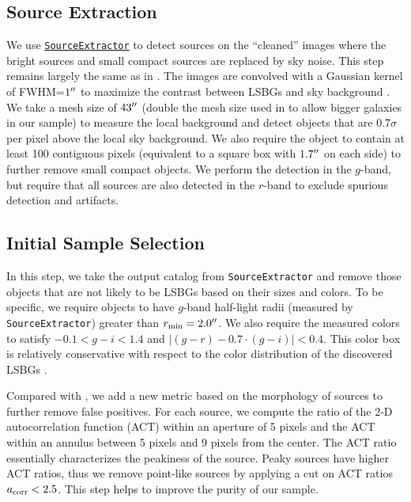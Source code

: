 \documentclass[twocolumn,astrosymb,twocolappendix]{aastex631}
\newcommand{\code}[1]{\texttt{#1}}
\begin{document}
\begin{CJK*}{UTF8}{gbsn}
\subsection{Source Extraction}
We use \href{https://www.astromatic.net/software/sextractor/}{\code{SourceExtractor}} \citep{Bertin1996} to detect sources on the ``cleaned'' images where the bright sources and small compact sources are replaced by sky noise. This step remains largely the same as in . The images are convolved with a Gaussian kernel of FWHM=$1\mbox{$^{\prime\prime}$}$ to maximize the contrast between LSBGs and sky background \citep[e.g.,][]{Irwin1985,Akhlaghi2015,Greco2018}. We take a mesh size of $43\mbox{$^{\prime\prime}$}$ (double the mesh size used in  to allow bigger galaxies in our sample) to measure the local background and detect objects that are 0.7$\sigma$ per pixel above the local sky background. We also require the object to contain at least 100 contiguous pixels (equivalent to a square box with $1.7\mbox{$^{\prime\prime}$}$ on each side) to further remove small compact objects. We perform the detection in the $g$-band, but require that all sources are also detected in the $r$-band to exclude spurious detection and artifacts.
    
\subsection{Initial Sample Selection} 
In this step, we take the output catalog from \code{SourceExtractor} and remove those objects that are not likely to be LSBGs based on their sizes and colors. To be specific, we require objects to have $g$-band half-light radii (measured by \code{SourceExtractor}) greater than $r_{\rm min} = 2.0\mbox{$^{\prime\prime}$}$. We also require the measured colors to satisfy $-0.1 < g-i < 1.4$ and $|(g-r) - 0.7\cdot (g-i)| < 0.4$. This color box is relatively conservative with respect to the color distribution of the discovered LSBGs \citep[e.g.,][]{SAGA-I,Greco2018,Zaritsky2019,Tanoglidis2021}. 

Compared with , we add a new metric based on the morphology of sources to further remove false positives. For each source, we compute the ratio of the 2-D autocorrelation function (ACT) within an aperture of 5 pixels and the ACT within an annulus between 5 pixels and 9 pixels from the center. The ACT ratio essentially characterizes the peakiness of the source. Peaky sources have higher ACT ratios, thus we remove point-like sources by applying a cut on ACT ratios $a_{\rm corr} < 2.5$. This step helps to improve the purity of our sample.


\end{CJK*}
\end{document}

